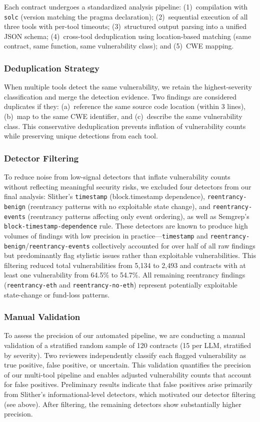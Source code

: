 Each contract undergoes a standardized analysis pipeline: (1)~compilation with \texttt{solc} (version matching the pragma declaration); (2)~sequential execution of all three tools with per-tool timeouts; (3)~structured output parsing into a unified JSON schema; (4)~cross-tool deduplication using location-based matching (same contract, same function, same vulnerability class); and (5)~CWE mapping.

\subsubsection{Deduplication Strategy}
When multiple tools detect the same vulnerability, we retain the highest-severity classification and merge the detection evidence. Two findings are considered duplicates if they: (a)~reference the same source code location (within 3 lines), (b)~map to the same CWE identifier, and (c)~describe the same vulnerability class. This conservative deduplication prevents inflation of vulnerability counts while preserving unique detections from each tool.

\subsubsection{Detector Filtering}
To reduce noise from low-signal detectors that inflate vulnerability counts without reflecting meaningful security risks, we excluded four detectors from our final analysis: Slither's \texttt{timestamp} (block.timestamp dependence), \texttt{reentrancy-benign} (reentrancy patterns with no exploitable state change), and \texttt{reentrancy-events} (reentrancy patterns affecting only event ordering), as well as Semgrep's \texttt{block-timestamp-dependence} rule. These detectors are known to produce high volumes of findings with low precision in practice---\texttt{timestamp} and \texttt{reentrancy-benign}/\texttt{reentrancy-events} collectively accounted for over half of all raw findings but predominantly flag stylistic issues rather than exploitable vulnerabilities. This filtering reduced total vulnerabilities from 5,134 to 2,493 and contracts with at least one vulnerability from 64.5\% to 54.7\%. All remaining reentrancy findings (\texttt{reentrancy-eth} and \texttt{reentrancy-no-eth}) represent potentially exploitable state-change or fund-loss patterns.

\subsubsection{Manual Validation}
To assess the precision of our automated pipeline, we are conducting a manual validation of a stratified random sample of 120 contracts (15 per LLM, stratified by severity). Two reviewers independently classify each flagged vulnerability as true positive, false positive, or uncertain. This validation quantifies the precision of our multi-tool pipeline and enables adjusted vulnerability counts that account for false positives. Preliminary results indicate that false positives arise primarily from Slither's informational-level detectors, which motivated our detector filtering (see above). After filtering, the remaining detectors show substantially higher precision.

